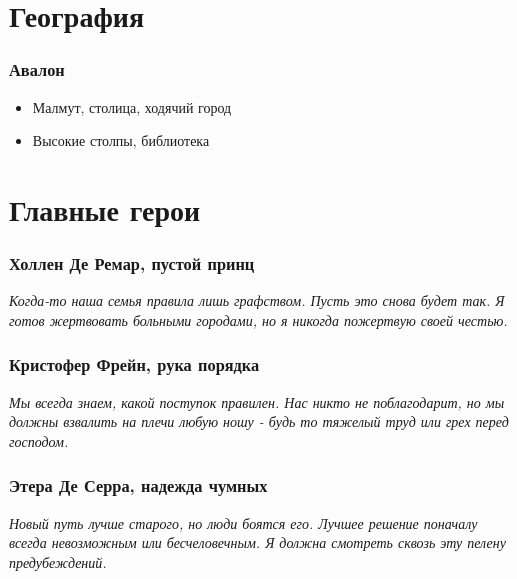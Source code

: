 \part{География}
\section{Авалон}
\begin{itemize}
	\item Малмут, столица, ходячий город
	\item Высокие столпы, библиотека
\end{itemize}

\part{Главные герои}
\section{Холлен Де Ремар, пустой принц}
\textit{Когда-то наша семья правила лишь графством. Пусть это снова будет так. Я готов жертвовать больными городами, но я никогда пожертвую своей честью.}
\section{Кристофер Фрейн, рука порядка}
\textit{Мы всегда знаем, какой поступок правилен. Нас никто не поблагодарит, но мы должны взвалить на плечи любую ношу - будь то тяжелый труд или грех перед господом.}
\section{Этера Де Серра, надежда чумных}
\textit{Новый путь лучше старого, но люди боятся его. Лучшее решение поначалу всегда невозможным или бесчеловечным. Я должна смотреть сквозь эту пелену предубеждений.}



